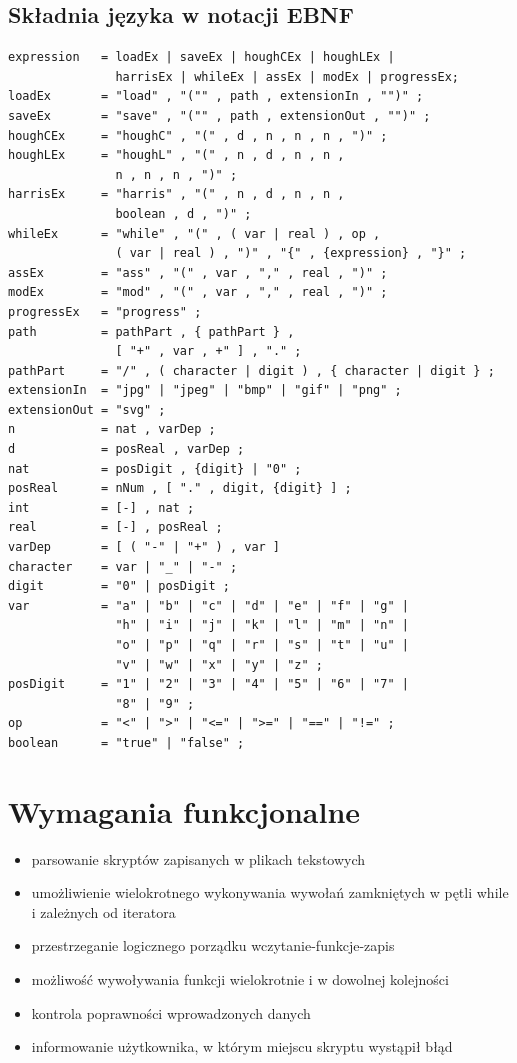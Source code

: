 \documentclass[11pt,a4paper]{article}
\begin{document}
\subsection{Składnia języka w notacji EBNF}\label{gramatyka} 
\begin{verbatim}
expression   = loadEx | saveEx | houghCEx | houghLEx |
               harrisEx | whileEx | assEx | modEx | progressEx;   
loadEx       = "load" , "("" , path , extensionIn , "")" ;
saveEx       = "save" , "("" , path , extensionOut , "")" ;
houghCEx     = "houghC" , "(" , d , n , n , n , ")" ;
houghLEx     = "houghL" , "(" , n , d , n , n ,
               n , n , n , ")" ;
harrisEx     = "harris" , "(" , n , d , n , n ,
               boolean , d , ")" ;
whileEx      = "while" , "(" , ( var | real ) , op ,
               ( var | real ) , ")" , "{" , {expression} , "}" ;
assEx        = "ass" , "(" , var , "," , real , ")" ;
modEx        = "mod" , "(" , var , "," , real , ")" ;
progressEx   = "progress" ;
path         = pathPart , { pathPart } ,
               [ "+" , var , +" ] , "." ;
pathPart     = "/" , ( character | digit ) , { character | digit } ;
extensionIn  = "jpg" | "jpeg" | "bmp" | "gif" | "png" ;
extensionOut = "svg" ;
n            = nat , varDep ;
d            = posReal , varDep ;
nat          = posDigit , {digit} | "0" ;
posReal      = nNum , [ "." , digit, {digit} ] ;
int          = [-] , nat ;
real         = [-] , posReal ;
varDep       = [ ( "-" | "+" ) , var ]
character    = var | "_" | "-" ;       
digit        = "0" | posDigit ;
var          = "a" | "b" | "c" | "d" | "e" | "f" | "g" |
               "h" | "i" | "j" | "k" | "l" | "m" | "n" |
               "o" | "p" | "q" | "r" | "s" | "t" | "u" |
               "v" | "w" | "x" | "y" | "z" ;
posDigit     = "1" | "2" | "3" | "4" | "5" | "6" | "7" |
               "8" | "9" ;
op           = "<" | ">" | "<=" | ">=" | "==" | "!=" ;                 
boolean      = "true" | "false" ;                  
\end{verbatim}

\section{Wymagania funkcjonalne}
\begin{itemize}
\item{parsowanie skryptów zapisanych w plikach tekstowych}
\item{umożliwienie wielokrotnego wykonywania wywołań zamkniętych w pętli while i zależnych od iteratora}
\item{przestrzeganie logicznego porządku wczytanie-funkcje-zapis}
\item{możliwość wywoływania funkcji wielokrotnie i w dowolnej kolejności}
\item{kontrola poprawności wprowadzonych danych}
\item{informowanie użytkownika, w którym miejscu skryptu wystąpił błąd}
\end{itemize}
\end{document}
